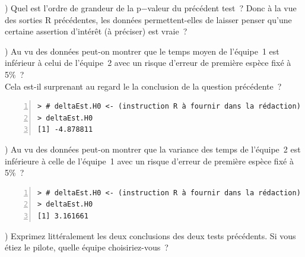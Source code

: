 \documentclass[10pt]{report}
\begin{document}
\begin{exercice}
) Quel est l'ordre de grandeur de la p$-$valeur du précédent test~? Donc à la vue des sorties R précédentes, les données permettent-elles de laisser penser qu'une certaine assertion d'intérêt (à préciser) est vraie~?



) Au vu des données peut-on montrer que le temps moyen de l'équipe~1 est inférieur à celui de l'équipe~2  avec un risque d'erreur de première espèce fixé à 5\%~?\\
Cela est-il surprenant au regard le la conclusion de la question précédente~?\\
\IndicR
\begin{Verbatim}[frame=leftline,fontfamily=tt,fontshape=n,numbers=left]
> # deltaEst.H0 <- (instruction R à fournir dans la rédaction)
> deltaEst.H0
[1] -4.878811
\end{Verbatim}




) Au vu des données peut-on montrer que la variance des temps de l'équipe~2 est inférieure à celle de l'équipe~1  avec un risque d'erreur de première espèce fixé à 5\%~?\\
\IndicR
\begin{Verbatim}[frame=leftline,fontfamily=tt,fontshape=n,numbers=left]
> # deltaEst.H0 <- (instruction R à fournir dans la rédaction)
> deltaEst.H0
[1] 3.161661
\end{Verbatim}




) Exprimez littéralement les deux conclusions des deux tests précédents. Si vous étiez le pilote, quelle équipe choisiriez-vous~?



\end{exercice}
\end{document}
